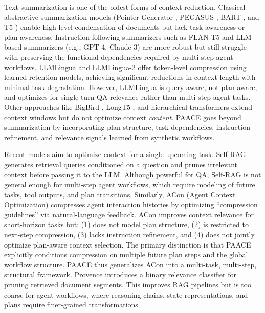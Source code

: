 \documentclass{article}
\theoremstyle{plain}
\theoremstyle{definition}
\theoremstyle{remark}
\begin{document}
Text summarization is one of the oldest forms of context reduction.
Classical abstractive summarization models (Pointer-Generator \citep{see2017pg},
PEGASUS \citep{zhang2019pegasus}, BART \citep{lewis2019bart},
and T5 \citep{raffel2020t5}) enable high-level condensation of documents
but lack task-awareness or plan-awareness. Instruction-following summarizers such as FLAN-T5 \citep{chung2022flan}
and LLM-based summarizers (e.g., GPT-4, Claude 3) are more robust but
still struggle with preserving the functional dependencies required by
multi-step agent workflows. LLMLingua \citep{jiang2023llmlingua} and LLMLingua-2 \citep{jiang2024llmlingua2}
offer token-level compression using learned retention models, achieving
significant reductions in context length with minimal task degradation.
However, LLMLingua is query-aware, not plan-aware, and optimizes for
single-turn QA relevance rather than multi-step agent tasks. Other approaches like BigBird \citep{zaheer2020bigbird},
LongT5 \citep{guo2021longt5}, and hierarchical transformers
extend context windows but do not optimize context \emph{content}. PAACE goes beyond summarization by incorporating plan structure,
task dependencies, instruction refinement, and relevance
signals learned from synthetic workflows.

Recent models aim to optimize context for a single upcoming task.
Self-RAG \citep{asai2024selfrag} generates retrieval queries conditioned on
a question and prunes irrelevant context before passing it to the LLM.
Although powerful for QA, Self-RAG is not general enough for multi-step
agent workflows, which require modeling of future tasks, tool outputs,
and plan transitions. Similarly, ACon (Agent Context Optimization) \citep{acon2025yu}
compresses agent interaction histories by optimizing “compression guidelines”
via natural-language feedback. ACon improves context relevance for
short-horizon tasks but:
(1) does not model plan structure,
(2) is restricted to next-step compression,
(3) lacks instruction refinement, and
(4) does not jointly optimize plan-aware context selection.
The primary distinction is that PAACE explicitly conditions compression on
multiple future plan steps and the global workflow structure.
PAACE thus generalizes ACon into a multi-task, multi-step, structural framework. Provence \citep{wu2024provence} introduces a binary relevance classifier for
pruning retrieved document segments. This improves RAG pipelines but is too
coarse for agent workflows, where reasoning chains, state representations,
and plans require finer-grained transformations.
\end{document}
